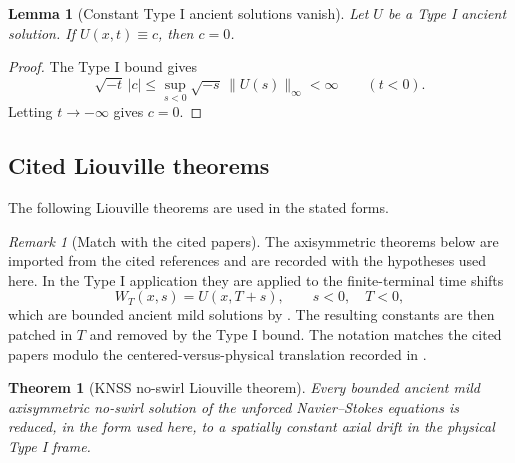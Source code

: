 \documentclass[11pt]{amsart}
\theoremstyle{plain}
\newtheorem{theorem}{Theorem}[section]
\newtheorem{lemma}[lemma]{Lemma}
\theoremstyle{definition}
\theoremstyle{remark}
\newtheorem{remark}[remark]{Remark}
\numberwithin{equation}{section}
\begin{document}
\begin{lemma}[Constant Type I ancient solutions vanish]
\label{p3:lem:galilean-typeI-zero}
Let \(U\) be a Type I ancient solution.  If \(U(x,t)\equiv c\), then
\(c=0\).
\end{lemma}

\begin{proof}
The Type I bound gives
\[
   \sqrt{-t}\,|c|
   \le
   \sup_{s<0}\sqrt{-s}\,\|U(s)\|_\infty<\infty
   \qquad(t<0).
\]
Letting \(t\to-\infty\) gives \(c=0\).
\end{proof}

\subsection{Cited Liouville theorems}

The following Liouville theorems are used in the stated forms.

\begin{remark}[Match with the cited papers]\label{p3:rem:axi-citations}
The axisymmetric theorems below are imported from the cited references and are
recorded with the hypotheses used here.  In the Type I application they are
applied to the finite-terminal time shifts
\[
   W_T(x,s)=U(x,T+s),\qquad s<0,\quad T<0,
\]
which are bounded ancient mild solutions by
.  The resulting constants are then patched in \(T\)
and removed by the Type I bound.  The notation matches the cited papers
modulo the centered-versus-physical translation recorded in
.
\end{remark}

\begin{theorem}[KNSS no-swirl Liouville theorem]
\label{p3:thm:knss-noswirl}
Every bounded ancient mild axisymmetric no-swirl solution of the unforced
Navier--Stokes equations is reduced, in the form used here, to a spatially
constant axial drift in the physical Type I frame.
\end{theorem}
\end{document}
